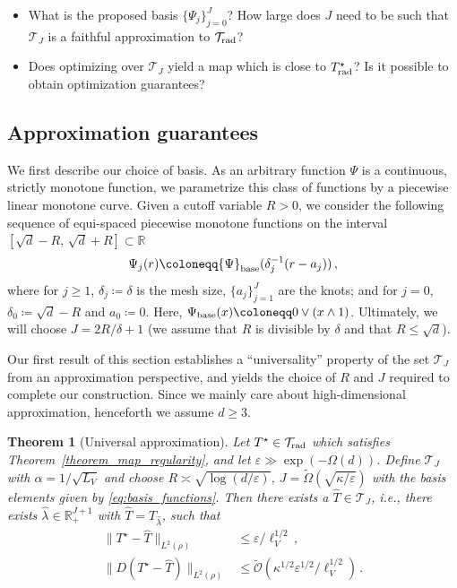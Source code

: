 \documentclass[twoside]{article}
\newcommand{\cT}{\mathcal{T}}
\newcommand{\1}{\mathds{1}}
\newcommand{\R}{\mathbb{R}}
\newcommand{\eps}{\varepsilon}
\renewcommand{\epsilon}{\varepsilon}
\newcommand*{\defeq}{\coloneqq}
\theoremstyle{plain}
\newtheorem{theorem}{Theorem}[section]
\theoremstyle{definition}
\theoremstyle{remark}
\begin{document}
\begin{itemize}
    \item  What is the proposed basis ${\{\Psi_j\}_{j=0}^J}$? How large does $J$ need to be such that $\cT_J$ is a faithful approximation to $\cT_{\rm rad}$?
    \item Does optimizing over $\cT_J$ yield a map which is close to $T^\star_{\rm rad}$? Is it possible to obtain optimization guarantees? 
\end{itemize}

\subsection{Approximation guarantees}\label{sec:approx_guarantees}
We first describe our choice of basis. As an arbitrary function ${\Psi}$ is a continuous, strictly monotone function, we parametrize this class of functions by a piecewise linear monotone curve. Given a cutoff variable $R > 0$, we consider the following sequence of equi-spaced piecewise monotone functions on the interval $[\sqrt d - R,\, \sqrt d + R] \subset \R$
\begin{align}\label{eq:basis_functions}
    {\Psi}_j(r) \defeq {\Psi}_{\rm base}(\delta_j^{-1}(r-a_j))\,,
\end{align}
where for $j\ge 1$, $\delta_j \defeq \delta$ is the mesh size, $\{a_j\}_{j=1}^J$ are the knots; and for $j=0$, $\delta_0 \defeq \sqrt d - R$ and $a_0 \defeq 0$.
Here, $\Psi_{\rm base}(x) \defeq 0 \vee (x \wedge 1)$.
Ultimately, we will choose {$J = 2R/\delta + 1$ (we assume that $R$ is divisible by $\delta$ and that $R \le \sqrt d$)}.

Our first result of this section establishes a ``universality'' property of the set $\cT_J$ from an approximation perspective, and yields the choice of $R$ and $J$ required to complete our construction. {Since we mainly care about high-dimensional approximation, henceforth we assume $d\ge 3$.}

\begin{theorem}[Universal approximation]\label{theorem_unif_approx}
Let $T^\star \in \cT_{\rm rad}$ which satisfies Theorem~\ref{theorem_map_regularity}, and let ${\epsilon \gg \exp(-\Omega(d))}$. Define $\cT_J$ with $\alpha = 1/\sqrt{L_V}$ and choose $R \asymp {\sqrt{\log(d/\epsilon)}}$, $J = {\widetilde{\Omega}(\sqrt{\kappa/\eps})}$ with the basis elements given by \eqref{eq:basis_functions}. Then there exists a $\hat{T} \in \cT_J$, i.e., there exists $\hat{\lambda} \in \R^{J+1}_+$ with $\hat{T} = T_{\hat{\lambda}}$, such that
\begin{align*}
    \|T^{\star} - \hat{T}\|_{L^2(\rho)} &\leq \epsilon/\ell_V^{1/2}\,,\\
    \|D(T^{\star} - \hat{T} ) \|_{L^2(\rho)} &\le {\widetilde{\mathcal{O}}(\kappa^{1/2} \epsilon^{1/2}/\ell_{V}^{1/2})}\,.
\end{align*}
\end{theorem}
\end{document}
